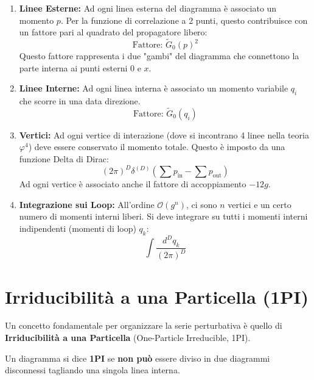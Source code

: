 \begin{enumerate}
    \item \textbf{Linee Esterne:}
    Ad ogni linea esterna del diagramma è associato un momento $p$. Per la funzione di correlazione a 2 punti, questo contribuisce con un fattore pari al quadrato del propagatore libero:
    \begin{equation}
        \text{Fattore: } \tilde{G}_0(p)^2
    \end{equation}
    Questo fattore rappresenta i due "gambi" del diagramma che connettono la parte interna ai punti esterni 0 e $x$.

    \item \textbf{Linee Interne:}
    Ad ogni linea interna è associato un momento variabile $q_i$ che scorre in una data direzione.
    \begin{equation}
        \text{Fattore: } \tilde{G}_0(q_i)
    \end{equation}

    \item \textbf{Vertici:}
    Ad ogni vertice di interazione (dove si incontrano 4 linee nella teoria $\varphi^4$) deve essere conservato il momento totale. Questo è imposto da una funzione Delta di Dirac:
    \begin{equation}
        (2\pi)^D \delta^{(D)} \left( \sum p_{\text{in}} - \sum p_{\text{out}} \right)
    \end{equation}
    Ad ogni vertice è associato anche il fattore di accoppiamento  $-12g$.

    \item \textbf{Integrazione sui Loop:}
    All'ordine $\mathcal{O}(g^n)$, ci sono $n$ vertici e un certo numero di momenti interni liberi. Si deve integrare su tutti i momenti interni indipendenti (momenti di loop) $q_k$:
    \begin{equation}
        \int \frac{d^D q_k}{(2\pi)^D}
    \end{equation}
\end{enumerate}


\section{Irriducibilità a una Particella (1PI)}

Un concetto fondamentale per organizzare la serie perturbativa è quello di \textbf{Irriducibilità a una Particella} (One-Particle Irreducible, 1PI).

\begin{tcolorbox}[colback=yellow!25, colframe=yellow!75!orange, coltitle=black, title=\textbf{Definizione 1PI}]
Un diagramma si dice \textbf{1PI} se \textbf{non può} essere diviso in due diagrammi disconnessi tagliando una singola linea interna.
\end{tcolorbox}

